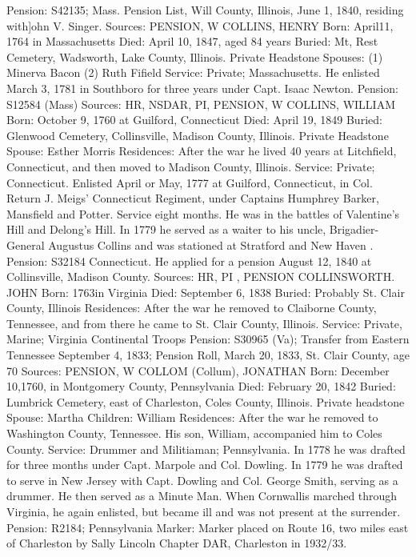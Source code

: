 Pension: S42135; Mass. Pension List, Will County, Illinois, June 1, 1840, residing with]ohn V. Singer. 
Sources: PENSION, W 
COLLINS, HENRY 
Born: April11, 1764 in Massachusetts 
Died: April 10, 1847, aged 84 years 
Buried: Mt, Rest Cemetery, Wadsworth, Lake County, Illinois. Private Headstone 
Spouses: (1) Minerva Bacon  (2) Ruth Fifield 
Service: Private; Massachusetts. He enlisted March 3, 1781 in Southboro for three years under Capt. Isaac Newton. 
Pension: S12584 (Mass) 
Sources: HR, NSDAR, PI, PENSION, W 
COLLINS, WILLIAM 
Born: October 9, 1760 at Guilford, Connecticut 
Died: April 19, 1849 
Buried: Glenwood Cemetery, Collinsville, Madison County, Illinois. Private Head­stone 
Spouse: Esther Morris 
Residences: After the war he lived 40 years at Litchfield, Connecticut, and then moved to Madison County, Illinois. 
Service: Private; Connecticut. Enlisted April or May, 1777 at Guilford, Connec­ticut, in Col. Return J. Meigs' Connecticut Regiment, under Captains Humph­rey Barker, Mansfield and Potter. Service eight months. He was in the battles of Valentine's Hill and Delong’s Hill. In 1779 he served as a waiter to his uncle, Brigadier-General Augustus Collins and was stationed at Strat­ford and New Haven . 
Pension: S32184 Connecticut. He applied for a pension August 12, 1840 at Collins­ville, Madison County. 
Sources: HR, PI , PENSION 
COLLINSWORTH. JOHN 
Born: 1763in Virginia 
Died: September 6, 1838 
Buried: Probably St. Clair County, Illinois 
Residences: After the war he removed to Claiborne County, Tennessee, and from there he came to St. Clair County, Illinois. 
Service: Private, Marine; Virginia Continental Troops 
Pension: S30965 (Va); Transfer from Eastern Tennessee September 4, 1833; Pen­sion Roll, March 20, 1833, St. Clair County, age 70 
Sources: PENSION, W 
COLLOM (Collum), JONATHAN 
Born: December 10,1760, in Montgomery County, Pennsylvania 
Died: February 20, 1842 
Buried: Lumbrick Cemetery, east of Charleston, Coles County, Illinois. Private headstone 
Spouse: Martha 
Children: William 
Residences: After the war he removed to Washington County, Tennessee. His son, William, accompanied him to Coles County. 
Service: Drummer and Militiaman; Pennsylvania. In 1778 he was drafted for three months under Capt. Marpole and Col. Dowling. In 1779 he was drafted to serve in New Jersey with Capt. Dowling and Col. George Smith, serving as a drummer. He then served as a Minute Man. When Cornwallis marched through Virginia, he again enlisted, but became ill and was not present at the surrender. 
Pension: R2184; Pennsylvania 
Marker: Marker placed on Route 16, two miles east of Charleston by Sally Lincoln Chapter DAR, Charleston in 1932/33. 
